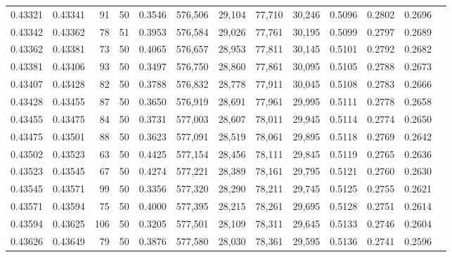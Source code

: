 \begin{tabular}{rrrrrrrrrrrrr}
0.43321 & 0.43341 &    91 &  50 &                                     0.3546 & 576,506 &  29,104 &  77,710 &  30,246 & 0.5096 & 0.2802 & 0.2696 \\
0.43342 & 0.43362 &    78 &  51 &                                     0.3953 & 576,584 &  29,026 &  77,761 &  30,195 & 0.5099 & 0.2797 & 0.2689 \\
0.43362 & 0.43381 &    73 &  50 &                                     0.4065 & 576,657 &  28,953 &  77,811 &  30,145 & 0.5101 & 0.2792 & 0.2682 \\
0.43381 & 0.43406 &    93 &  50 &                                     0.3497 & 576,750 &  28,860 &  77,861 &  30,095 & 0.5105 & 0.2788 & 0.2673 \\
0.43407 & 0.43428 &    82 &  50 &                                     0.3788 & 576,832 &  28,778 &  77,911 &  30,045 & 0.5108 & 0.2783 & 0.2666 \\
0.43428 & 0.43455 &    87 &  50 &                                     0.3650 & 576,919 &  28,691 &  77,961 &  29,995 & 0.5111 & 0.2778 & 0.2658 \\
0.43455 & 0.43475 &    84 &  50 &                                     0.3731 & 577,003 &  28,607 &  78,011 &  29,945 & 0.5114 & 0.2774 & 0.2650 \\
0.43475 & 0.43501 &    88 &  50 &                                     0.3623 & 577,091 &  28,519 &  78,061 &  29,895 & 0.5118 & 0.2769 & 0.2642 \\
0.43502 & 0.43523 &    63 &  50 &                                     0.4425 & 577,154 &  28,456 &  78,111 &  29,845 & 0.5119 & 0.2765 & 0.2636 \\
0.43523 & 0.43545 &    67 &  50 &                                     0.4274 & 577,221 &  28,389 &  78,161 &  29,795 & 0.5121 & 0.2760 & 0.2630 \\
0.43545 & 0.43571 &    99 &  50 &                                     0.3356 & 577,320 &  28,290 &  78,211 &  29,745 & 0.5125 & 0.2755 & 0.2621 \\
0.43571 & 0.43594 &    75 &  50 &                                     0.4000 & 577,395 &  28,215 &  78,261 &  29,695 & 0.5128 & 0.2751 & 0.2614 \\
0.43594 & 0.43625 &   106 &  50 &                                     0.3205 & 577,501 &  28,109 &  78,311 &  29,645 & 0.5133 & 0.2746 & 0.2604 \\
0.43626 & 0.43649 &    79 &  50 &                                     0.3876 & 577,580 &  28,030 &  78,361 &  29,595 & 0.5136 & 0.2741 & 0.2596 \\

\end{tabular}
